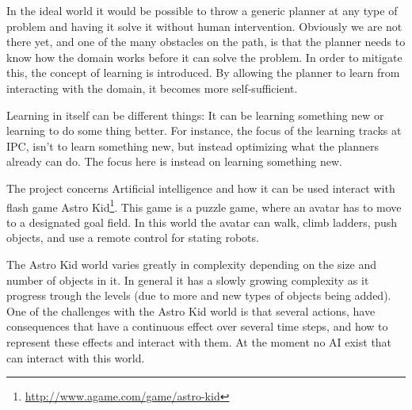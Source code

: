 	
	In the ideal world it would be possible to throw a generic planner at any type of problem and having it solve it without human intervention. Obviously we are not there yet, and one of the many obstacles on the path, is that the planner needs to know how the domain works before it can solve the problem. In order to mitigate this, the concept of learning is introduced. By allowing the planner to learn from interacting with the domain, it becomes more self-sufficient.

	Learning in itself can be different things: It can be learning something new or learning to do some thing better. For instance, the focus of the learning tracks at IPC, isn't to learn something new, but instead optimizing what the planners already can do. The focus here is instead on learning something new. %



	The project concerns Artificial intelligence and how it can be used interact with flash game Astro Kid\footnote{\url{http://www.agame.com/game/astro-kid}}. This game is a puzzle game, where an avatar has to move to a designated goal field. In this world the avatar can walk, climb ladders, push objects, and use a remote control for stating robots.
	
	The Astro Kid world varies greatly in complexity depending on the size and number of objects in it. In general it has a slowly growing complexity as it progress trough the levels (due to more and new types of objects being added). One of the challenges with the Astro Kid world is that several actions, have consequences that have a continuous effect over several time steps, and how to represent these effects and interact with them. At the moment no AI exist that can interact with this world. 

